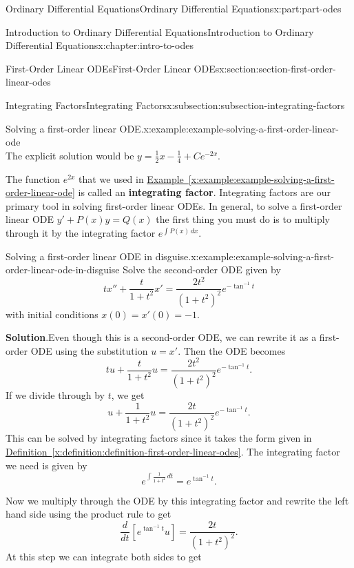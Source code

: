 \documentclass[twoside,10pt,]{book}
\newcommand{\blocktitlefont}{\relax}
\newcommand{\xreffont}{\relax}
\newcommand{\terminology}[1]{\textbf{#1}}
\numberwithin{equation}{part}
\providecommand{\dv}[3][]{\dfrac{d^{#1} #2}{d #3^{#1}}}
\begin{document}
\begin{partptx}{Ordinary Differential Equations}{}{Ordinary Differential Equations}{}{}{x:part:part-odes}
\begin{chapterptx}{Introduction to Ordinary Differential Equations}{}{Introduction to Ordinary Differential Equations}{}{}{x:chapter:intro-to-odes}
\begin{sectionptx}{First-Order Linear ODEs}{}{First-Order Linear ODEs}{}{}{x:section:section-first-order-linear-odes}
\begin{subsectionptx}{Integrating Factors}{}{Integrating Factors}{}{}{x:subsection:subsection-integrating-factors}
\begin{example}{Solving a first-order linear ODE.}{x:example:example-solving-a-first-order-linear-ode}
\begin{equation*}
\end{equation*}
The explicit solution would be \(y = \frac{1}{2}x - \frac{1}{4} + Ce^{-2x}\).%
\end{example}
The function \(e^{2x}\) that we used in \hyperref[x:example:example-solving-a-first-order-linear-ode]{Example~{\xreffont\ref{x:example:example-solving-a-first-order-linear-ode}}} is called an \terminology{integrating factor}. Integrating factors are our primary tool in solving first-order linear ODEs. In general, to solve a first-order linear ODE \(y' +P(x)y=Q(x)\) the first thing you must do is to multiply through it by the integrating factor \(e^{\int P(x)\,dx}\).%
\begin{example}{Solving a first-order linear ODE in disguise.}{x:example:example-solving-a-first-order-linear-ode-in-disguise}%
Solve the second-order ODE given by%
\begin{equation*}
tx''+\frac{t}{1+t^{2}}x' = \frac{2t^{2}}{(1+t^{2})^{2}}e^{-\tan^{-1}t}
\end{equation*}
with initial conditions \(x(0) = x'(0) = -1.\)%
\par\smallskip%
\noindent\textbf{\blocktitlefont Solution}.\hypertarget{g:solution:idp105548816300448}{}\quad{}Even though this is a second-order ODE, we can rewrite it as a first-order ODE using the substitution \(u = x'\). Then the ODE becomes%
\begin{equation*}
tu+\frac{t}{1+t^{2}}u = \frac{2t^{2}}{(1+t^{2})^{2}}e^{-\tan^{-1}t}.
\end{equation*}
If we divide through by \(t\), we get%
\begin{equation*}
u+\frac{1}{1+t^{2}}u = \frac{2t}{(1+t^{2})^{2}}e^{-\tan^{-1}t}.
\end{equation*}
This can be solved by integrating factors since it takes the form given in \hyperref[x:definition:definition-first-order-linear-odes]{Definition~{\xreffont\ref{x:definition:definition-first-order-linear-odes}}}. The integrating factor we need is given by%
\begin{equation*}
e^{\int \frac{1}{1+t^{2}}\,dt} = e^{\tan^{-1}t}.
\end{equation*}
%
\par
Now we multiply through the ODE by this integrating factor and rewrite the left hand side using the product rule to get%
\begin{equation*}
\dv{}{t}[e^{\tan^{-1}t}u] = \frac{2t}{(1+t^{2})^{2}}.
\end{equation*}
At this step we can integrate both sides to get%
\begin{equation*}

\end{equation*}
\end{example}
\end{subsectionptx}
\end{sectionptx}
\end{chapterptx}
\end{partptx}
\end{document}
